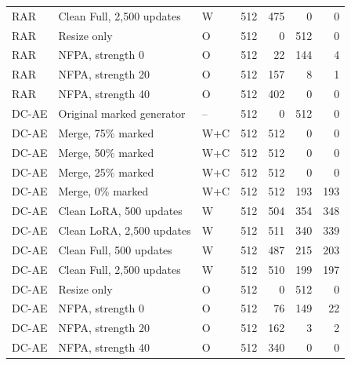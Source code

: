 {\begin{longtable}{lp{.27\linewidth}lrrrr}
RAR & Clean Full, 2,500 updates & W & 512 & 475 & 0 & 0 \\
RAR & Resize only & O & 512 & 0 & 512 & 0 \\
RAR & NFPA, strength 0 & O & 512 & 22 & 144 & 4 \\
RAR & NFPA, strength 20 & O & 512 & 157 & 8 & 1 \\
RAR & NFPA, strength 40 & O & 512 & 402 & 0 & 0 \\
DC-AE & Original marked generator & -- & 512 & 0 & 512 & 0 \\
DC-AE & Merge, 75\% marked & W+C & 512 & 512 & 0 & 0 \\
DC-AE & Merge, 50\% marked & W+C & 512 & 512 & 0 & 0 \\
DC-AE & Merge, 25\% marked & W+C & 512 & 512 & 0 & 0 \\
DC-AE & Merge, 0\% marked & W+C & 512 & 512 & 193 & 193 \\
DC-AE & Clean LoRA, 500 updates & W & 512 & 504 & 354 & 348 \\
DC-AE & Clean LoRA, 2,500 updates & W & 512 & 511 & 340 & 339 \\
DC-AE & Clean Full, 500 updates & W & 512 & 487 & 215 & 203 \\
DC-AE & Clean Full, 2,500 updates & W & 512 & 510 & 199 & 197 \\
DC-AE & Resize only & O & 512 & 0 & 512 & 0 \\
DC-AE & NFPA, strength 0 & O & 512 & 76 & 149 & 22 \\
DC-AE & NFPA, strength 20 & O & 512 & 162 & 3 & 2 \\
DC-AE & NFPA, strength 40 & O & 512 & 340 & 0 & 0 \\
\bottomrule\end{longtable}}
